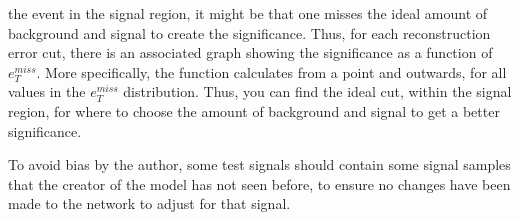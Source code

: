 the event in the signal region, it might be that one misses the ideal amount of background and signal to create 
the significance. Thus, for each reconstruction error cut, there is an associated graph showing the significance 
as a function of $e_T^{miss}$. More specifically, the function calculates from a point and outwards, for all 
values in the $e_T^{miss}$ distribution. Thus, you can find the ideal cut, within the signal region, for where to 
choose the amount of background and signal to get a better significance.\par 
To avoid bias by the author, some test signals should contain some signal samples that the creator of the 
model has not seen before, to ensure no changes have been made to the network to adjust for that signal.
